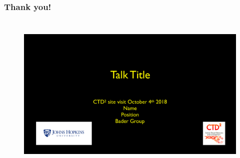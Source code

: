 \documentclass{beamer} %
\begin{document}
\begin{frame}
 	\frametitle{Thank you!}
	\begin{columns}
    \column{\dimexpr\paperwidth-10pt}
    	\begin{figure}
		\centering
		\includegraphics[page=2, height=7cm]{TitleAckDraft.pdf}
	\end{figure}
  \end{columns}



\end{frame}

\end{document}
